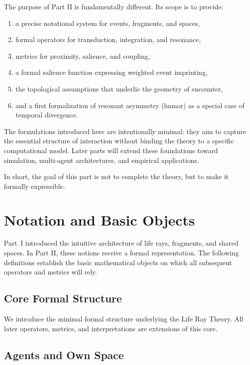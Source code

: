 \documentclass[12pt,a4paper]{article}
\begin{document}
The purpose of Part II is fundamentally different. Its scope is to provide:
\begin{enumerate}
    \item a precise notational system for events, fragments, and spaces,
    \item formal operators for transduction, integration, and resonance,
    \item metrics for proximity, salience, and coupling,
    \item a formal salience function expressing weighted event imprinting,
    \item the topological assumptions that underlie the geometry of encounter,
    \item and a first formalization of resonant asymmetry (humor) as a
          special case of temporal divergence.
\end{enumerate}

The formulations introduced here are intentionally minimal: they aim to capture the
essential structure of interaction without binding the theory to a specific
computational model. Later parts will extend these foundations toward simulation,
multi-agent architectures, and empirical applications.

In short, the goal of this part is not to complete the theory, but to make it formally
expressible.

\section{Notation and Basic Objects}

Part~I introduced the intuitive architecture of life rays, fragments, and shared
spaces. In Part II, these notions receive a formal representation. The following
definitions establish the basic mathematical objects on which all subsequent
operators and metrics will rely.

\subsection{Core Formal Structure}

We introduce the minimal formal structure underlying the Life Ray Theory.
All later operators, metrics, and interpretations are extensions of this core.

\subsection{Agents and Own Space}
\end{document}
